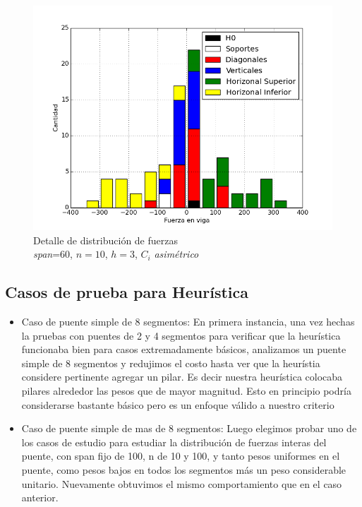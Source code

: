 \begin{figure}[h!]
\begin{center}
\includegraphics[scale=0.5]{archivos/graficos/hist_asim.png}
\caption{\label{fig:hist_asim}Detalle de distribución de fuerzas\\
\textit{span}=$60$, $n=10$, $h=3$, $C_i$ \textit{asimétrico}}
\end{center}
\end{figure}


\subsection{Casos de prueba para Heurística}
\begin{itemize}
	\item Caso de puente simple de 8 segmentos: En primera instancia, una vez hechas la pruebas con puentes de
2 y 4 segmentos para verificar que la heurística funcionaba bien para casos
extremadamente básicos, analizamos un puente simple de 8 segmentos y redujimos
el costo hasta ver que la heurístia considere pertinente agregar un pilar. Es decir nuestra heurística colocaba pilares alrededor las pesos que de mayor magnitud. Esto en principio podría considerarse bastante básico pero es un enfoque válido a nuestro criterio
	\item Caso de puente simple de mas de 8 segmentos:	Luego elegimos probar uno de los casos de estudio para estudiar la
distribución de fuerzas interas del puente, con span fijo de 100,
n de 10 y 100, y tanto pesos uniformes en el puente, como pesos
bajos en todos los segmentos más un peso considerable unitario. Nuevamente obtuvimos el mismo comportamiento que en el caso anterior.
\end{itemize}
